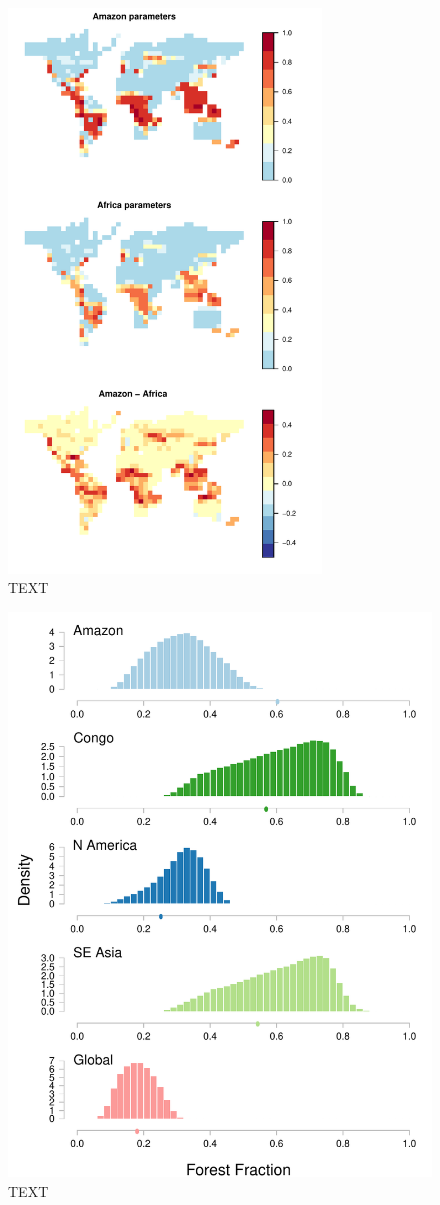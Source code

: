 \documentclass[esd, manuscript]{copernicus}
\begin{document}
\begin{figure}[t]
\includegraphics[width=8.3cm]{graphics/best_X_maps.pdf}
\caption{TEXT}
\label{fig:best_X_maps}
\end{figure}

\begin{figure}[t]
\includegraphics[width=12cm]{graphics/credible_NROY_hists_disc.pdf}
\caption{TEXT}
\label{fig:credible_NROY_hists_disc}
\end{figure}
\end{document}

